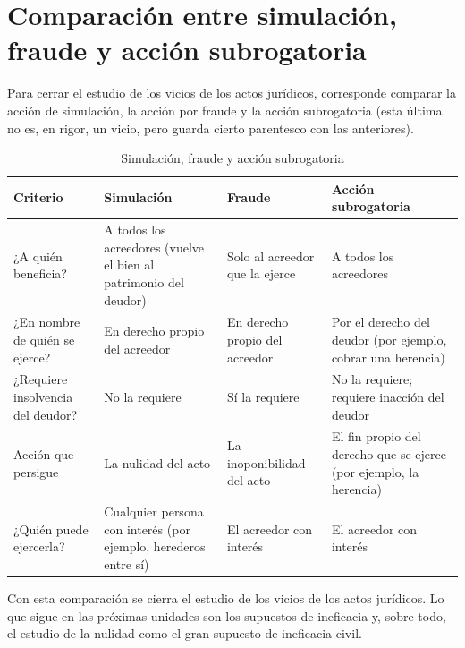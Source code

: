 \documentclass[12pt,oneside]{book}
\begin{document}
\chapter[Síntesis comparativa]{Comparación entre simulación, fraude y acción subrogatoria}

Para cerrar el estudio de los vicios de los actos jurídicos, corresponde comparar la acción de simulación, la acción por fraude y la acción subrogatoria (esta última no es, en rigor, un vicio, pero guarda cierto parentesco con las anteriores).

\begin{table}[H]
\centering
\caption{Simulación, fraude y acción subrogatoria}
\begin{tabularx}{\textwidth}{
    >{\raggedright\arraybackslash}p{}
    >{\raggedright\arraybackslash}X
    >{\raggedright\arraybackslash}X
    >{\raggedright\arraybackslash}X
}
\toprule
\textbf{Criterio} & \textbf{Simulación} & \textbf{Fraude} & \textbf{Acción subrogatoria} \\
\midrule
¿A quién beneficia? & A todos los acreedores (vuelve el bien al patrimonio del deudor) & Solo al acreedor que la ejerce & A todos los acreedores \\
\addlinespace
¿En nombre de quién se ejerce? & En derecho propio del acreedor & En derecho propio del acreedor & Por el derecho del deudor (por ejemplo, cobrar una herencia) \\
\addlinespace
¿Requiere insolvencia del deudor? & No la requiere & Sí la requiere & No la requiere; requiere inacción del deudor \\
\addlinespace
Acción que persigue & La nulidad del acto & La inoponibilidad del acto & El fin propio del derecho que se ejerce (por ejemplo, la herencia) \\
\addlinespace
¿Quién puede ejercerla? & Cualquier persona con interés (por ejemplo, herederos entre sí) & El acreedor con interés & El acreedor con interés \\
\bottomrule
\end{tabularx}
\end{table}

Con esta comparación se cierra el estudio de los vicios de los actos jurídicos. Lo que sigue en las próximas unidades son los supuestos de ineficacia y, sobre todo, el estudio de la nulidad como el gran supuesto de ineficacia civil.
\end{document}

